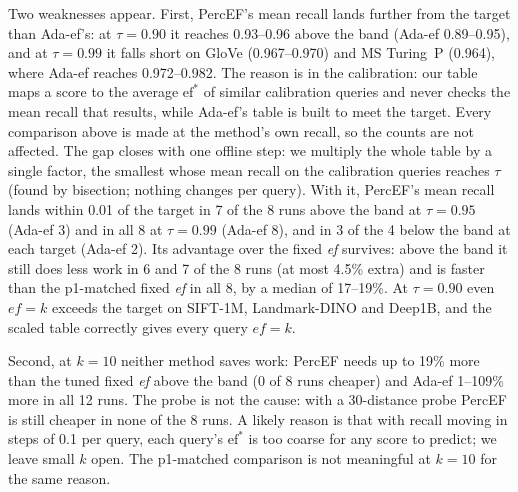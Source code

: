 \documentclass[sigconf,anonymous]{acmart}
\newcommand{\ef}{\textit{ef}}
\begin{document}
Two weaknesses appear. First, PercEF's mean recall lands further from the target than Ada-ef's:
at $\tau = 0.90$ it reaches 0.93--0.96 above the band (Ada-ef 0.89--0.95), and at $\tau = 0.99$ it
falls short on GloVe (0.967--0.970) and MS Turing~P (0.964), where Ada-ef reaches 0.972--0.982. The
reason is in the calibration: our table maps a score to the average $\mathrm{ef}^*$ of similar
calibration queries and never checks the mean recall that results, while Ada-ef's table is built to
meet the target. Every comparison above is made at the method's own recall, so the counts are not
affected. The gap closes with one offline step: we multiply the whole table by a single factor, the
smallest whose mean recall on the calibration queries reaches $\tau$ (found by bisection; nothing
changes per query). With it, PercEF's mean recall lands within 0.01 of the target in 7 of the 8 runs
above the band at $\tau = 0.95$ (Ada-ef 3) and in all 8 at $\tau = 0.99$ (Ada-ef 8), and in 3 of the 4
below the band at each target (Ada-ef 2). Its advantage over the fixed \ef{} survives: above the
band it still does less work in 6 and 7 of the 8 runs (at most 4.5\% extra) and is faster than the
p1-matched fixed \ef{} in all 8, by a median of 17--19\%. At $\tau = 0.90$ even $\mathit{ef} = k$
exceeds the target on SIFT-1M, Landmark-DINO and Deep1B, and the scaled table correctly gives every
query $\mathit{ef} = k$.

Second, at $k = 10$ neither method saves work: PercEF needs up to 19\% more than the tuned fixed
\ef{} above the band (0 of 8 runs cheaper) and Ada-ef 1--109\% more in all 12 runs. The probe is not
the cause: with a 30-distance probe PercEF is still cheaper in none of the 8 runs. A likely reason is
that with recall moving in steps of 0.1 per query, each query's $\mathrm{ef}^*$ is too coarse for any
score to predict; we leave small $k$ open. The p1-matched comparison is not meaningful at $k = 10$
for the same reason.
\end{document}
